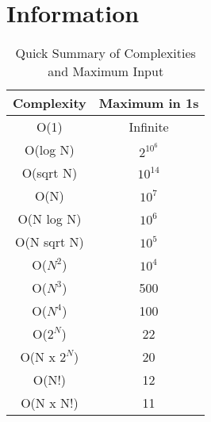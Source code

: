 \documentclass{article}
\begin{document}
\section{Information}
\begin{table}[H]
\begin{tabular}{|c|c|}
\hline
Complexity     & Maximum in 1s \\ \hline
O(1)           & Infinite      \\ \hline
O(log N)       & $2^{10^{6}}$  \\ \hline
O(sqrt N)      & $10^{14}$     \\ \hline
O(N)           & $10^{7}$      \\ \hline
O(N log N)     & $10^{6}$      \\ \hline
O(N sqrt N)    & $10^{5}$      \\ \hline
O($N^{2}$)     & $10^{4}$      \\ \hline
O($N^{3}$)     & 500           \\ \hline
O($N^{4}$)     & 100           \\ \hline
O($2^{N}$)     & 22            \\ \hline
O(N x $2^{N}$) & 20            \\ \hline
O(N!)          & 12            \\ \hline
O(N x N!)      & 11            \\ \hline
\end{tabular}
\caption{Quick Summary of Complexities and Maximum Input}
\label{tab:complexity}
\end{table}
\end{document}
